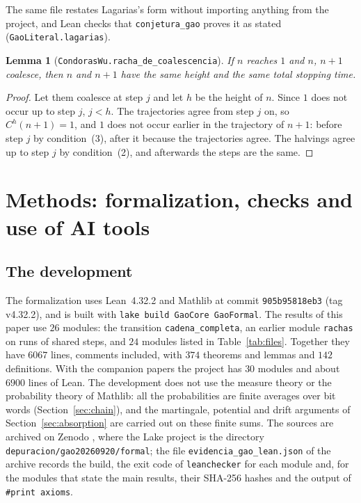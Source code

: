 \documentclass[11pt]{amsart}
\newtheorem{lemma}[theorem]{Lemma}
\theoremstyle{definition}
\theoremstyle{remark}
\newcommand{\lean}[1]{\nolinkurl{#1}}
\begin{document}
\noindent The same file restates Lagarias's form without importing anything from the project, and Lean checks that \lean{conjetura_gao} proves it as stated (\lean{GaoLiteral.lagarias}).

\begin{lemma}[\lean{CondorasWu.racha_de_coalescencia}]\label{lem:same-height}
If $n$ reaches $1$ and $n$, $n+1$ coalesce, then $n$ and $n+1$ have the same height and the same total stopping time.
\end{lemma}

\begin{proof}
Let them coalesce at step $j$ and let $h$ be the height of $n$. Since $1$ does not occur up to step $j$, $j<h$. The trajectories agree from step $j$ on, so $C^{h}(n+1)=1$, and $1$ does not occur earlier in the trajectory of $n+1$: before step $j$ by condition~(3), after it because the trajectories agree. The halvings agree up to step $j$ by condition~(2), and afterwards the steps are the same.
\end{proof}

\section{Methods: formalization, checks and use of AI tools}\label{sec:formal}

\subsection{The development}
The formalization uses Lean~4.32.2 and Mathlib at commit \texttt{905b95818eb3} (tag v4.32.2), and is built with \texttt{lake build GaoCore GaoFormal}. The results of this paper use $26$ modules: the transition \lean{cadena_completa}, an earlier module \texttt{rachas} on runs of shared steps, and $24$ modules listed in Table~\ref{tab:files}. Together they have $6067$ lines, comments included, with $374$ theorems and lemmas and $142$ definitions. With the companion papers the project has $30$ modules and about $6900$ lines of Lean. The development does not use the measure theory or the probability theory of Mathlib: all the probabilities are finite averages over bit words (Section~\ref{sec:chain}), and the martingale, potential and drift arguments of Section~\ref{sec:absorption} are carried out on these finite sums. The sources are archived on Zenodo \cite{Artifact}, where the Lake project is the directory \lean{depuracion/gao20260920/formal}; the file \texttt{evidencia\_gao\_lean.json} of the archive records the build, the exit code of \texttt{leanchecker} for each module and, for the modules that state the main results, their SHA-256 hashes and the output of \texttt{\#print axioms}.
\end{document}
